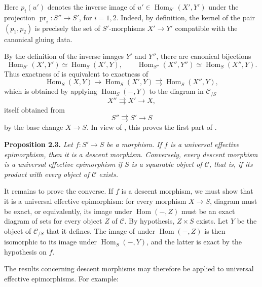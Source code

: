 Here \(p_i(u')\) denotes the inverse image of
\(u'\in\operatorname{Hom}_{S'}(X',Y')\) under the projection
\(\operatorname{pr}_i:S''\to S'\), for \(i=1,2\). Indeed, by definition,
the kernel of the pair \((p_1,p_2)\) is precisely the set of
\(S'\)-morphisms \(X'\to Y'\) compatible with the canonical gluing data.

By the definition of the inverse images \(Y'\) and \(Y''\), there are
canonical bijections
\[
  \operatorname{Hom}_{S'}(X',Y')\simeq\operatorname{Hom}_S(X',Y),
  \qquad
  \operatorname{Hom}_{S''}(X'',Y'')\simeq\operatorname{Hom}_S(X'',Y).
\]
Thus exactness of  is equivalent to exactness of
\[
\tag{xx}\label{sga3:iv:definition:2:2:eq:xx:01}
  \operatorname{Hom}_S(X,Y)
  \longrightarrow\operatorname{Hom}_S(X',Y)
  \rightrightarrows\operatorname{Hom}_S(X'',Y),
\]
which is obtained by applying \(\operatorname{Hom}_S(-,Y)\) to the diagram
in \(\mathscr C_{/S}\)
\[
\tag{xxx}\label{sga3:iv:definition:2:2:eq:xxx:01}
  X''\rightrightarrows X'\longrightarrow X,
\]
itself obtained from
\[
  S''\rightrightarrows S'\longrightarrow S
\]
by the base change \(X\to S\). In view of , this proves the first part of
.

\medskip
\noindent{}\textbf{Proposition 2.3.}
\textit{Let \(f:S'\to S\) be a morphism. If \(f\) is a universal effective
epimorphism, then it is a descent morphism. Conversely, every descent
morphism is a universal effective epimorphism if \(S\) is a squarable object
of \(\mathscr C\), that is, if its product with every object of
\(\mathscr C\) exists.}

It remains to prove the converse. If \(f\) is a descent morphism, we must
show that it is a universal effective epimorphism: for every morphism
\(X\to S\), diagram  must be exact, or equivalently, its image under
\(\operatorname{Hom}(-,Z)\) must be an exact diagram of sets for every
object \(Z\) of \(\mathscr C\). By hypothesis, \(Z\times S\) exists. Let
\(Y\) be the object of \(\mathscr C_{/S}\) that it defines. The image of
 under \(\operatorname{Hom}(-,Z)\) is then isomorphic to its image
under \(\operatorname{Hom}_S(-,Y)\), and the latter is exact by the
hypothesis on \(f\).

The results concerning descent morphisms may therefore be applied to
universal effective epimorphisms. For example:

